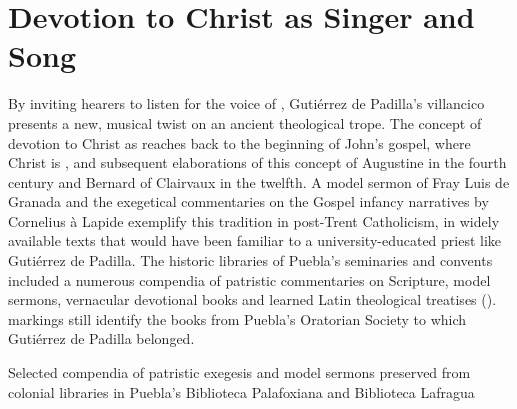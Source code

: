 \section{Devotion to Christ as Singer and Song}

By inviting hearers to listen for the voice of ,
Gutiérrez de Padilla's villancico presents a new, musical twist on an ancient
theological trope.
The concept of devotion to Christ as  reaches back to
the beginning of John's gospel, where Christ is ,
and subsequent elaborations of this concept of Augustine in the fourth century
and Bernard of Clairvaux in the twelfth.
A model sermon of Fray Luis de Granada and the exegetical commentaries on the
Gospel infancy narratives by Cornelius à Lapide exemplify this tradition in
post-Trent Catholicism, in widely available texts that would have been familiar
to a university-educated priest like Gutiérrez de Padilla.
The historic libraries of Puebla's seminaries and convents included a numerous
compendia of patristic commentaries on Scripture, model sermons, vernacular
devotional books and learned Latin theological treatises
().
 markings still identify the books from Puebla's 
Oratorian Society to which Gutiérrez de Padilla belonged.%
    \Autocite{Mauleon:PadillaCivil}


{Selected compendia of patristic exegesis and model sermons preserved from
colonial libraries in Puebla's Biblioteca Palafoxiana and Biblioteca Lafragua}

